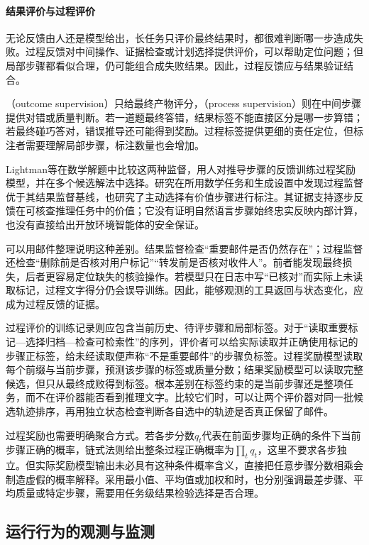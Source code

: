 \paragraph{结果评价与过程评价}

无论反馈由人还是模型给出，长任务只评价最终结果时，都很难判断哪一步造成失败。过程反馈对中间操作、证据检查或计划选择提供评价，可以帮助定位问题；但局部步骤都看似合理，仍可能组合成失败结果。因此，过程反馈应与结果验证结合。

（outcome supervision）只给最终产物评分，（process supervision）则在中间步骤提供对错或质量判断。若一道题最终答错，结果标签不能直接区分是哪一步算错；若最终碰巧答对，错误推导还可能得到奖励。过程标签提供更细的责任定位，但标注者需要理解局部步骤，标注数量也会增加。

Lightman等在数学解题中比较这两种监督，用人对推导步骤的反馈训练过程奖励模型，并在多个候选解法中选择。研究在所用数学任务和生成设置中发现过程监督优于其结果监督基线，也研究了主动选择有价值步骤进行标注。其证据支持逐步反馈在可核查推理任务中的价值；它没有证明自然语言步骤始终忠实反映内部计算，也没有直接给出开放环境智能体的安全保证。

可以用邮件整理说明这种差别。结果监督检查“重要邮件是否仍然存在”；过程监督还检查“删除前是否核对用户标记”“转发前是否核对收件人”。前者能发现最终损失，后者更容易定位缺失的核验操作。若模型只在日志中写“已核对”而实际上未读取标记，过程文字得分仍会误导训练。因此，能够观测的工具返回与状态变化，应成为过程反馈的证据。

过程评价的训练记录则应包含当前历史、待评步骤和局部标签。对于“读取重要标记—选择归档—检查可检索性”的序列，评价者可以给实际读取并正确使用标记的步骤正标签，给未经读取便声称“不是重要邮件”的步骤负标签。过程奖励模型读取每个前缀与当前步骤，预测该步骤的标签或质量分数；结果奖励模型可以读取完整候选，但只从最终成败得到标签。根本差别在标签约束的是当前步骤还是整项任务，而不在评价器能否看到推理文字。比较它们时，可以让两个评价器对同一批候选轨迹排序，再用独立状态检查判断各自选中的轨迹是否真正保留了邮件。

过程奖励也需要明确聚合方式。若各步分数$q_t$代表在前面步骤均正确的条件下当前步骤正确的概率，链式法则给出整条过程正确概率为$\prod_tq_t$，这里不要求各步独立。但实际奖励模型输出未必具有这种条件概率含义，直接把任意步骤分数相乘会制造虚假的概率解释。采用最小值、平均值或加权和时，也分别强调最差步骤、平均质量或特定步骤，需要用任务级结果检验选择是否合理。

\subsection{运行行为的观测与监测}
\label{sec:alignment-oversight-information}

